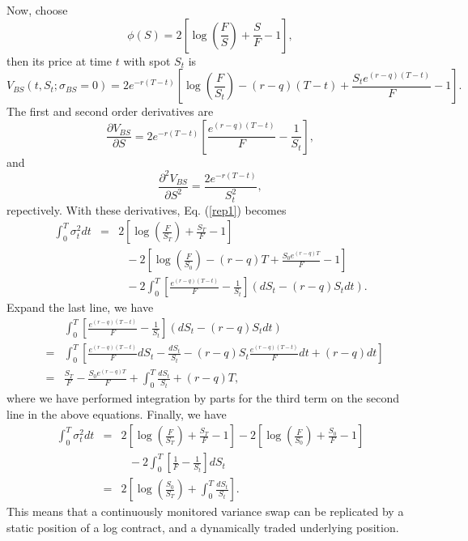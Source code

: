 \documentclass[12pt]{article}
\begin{document}
    Now, choose
    \begin{equation}
      \phi(S) = 2\left[\log\left(\frac{F}{S}\right)+\frac{S}{F}-1\right],
    \end{equation}
    then its price at time $t$ with spot $S_t$ is
    \begin{equation}
      V_{BS}(t,S_t;\sigma_{BS} = 0) = 2e^{-r(T-t)}\left[\log\left(\frac{F}{S_t}\right)-(r-q)(T-t)+\frac{S_te^{(r-q)(T-t)}}{F}-1\right].
    \end{equation}
    The first and second order derivatives are
    \begin{equation}
      \frac{\partial V_{BS}}{\partial S}=2e^{-r(T-t)}\left[\frac{e^{(r-q)(T-t)}}{F}-\frac{1}{S_t}\right],
    \end{equation}
    and
    \begin{equation}
      \frac{\partial^2 V_{BS}}{\partial S^2}=\frac{2e^{-r(T-t)}}{S_t^2},
    \end{equation}
    repectively. With these derivatives, Eq. (\ref{rep1}) becomes
    \begin{eqnarray}
      \int_0^T\sigma_t^2dt &=& 2\left[\log\left(\frac{F}{S_T}\right)+\frac{S_T}{F}-1\right]\nonumber\\
                            && \ \ \ - 2\left[\log\left(\frac{F}{S_0}\right)-(r-q)T+\frac{S_0e^{(r-q)T}}{F}-1\right]\nonumber\\
                            && \ \ \ - 2\int_0^T\left[\frac{e^{(r-q)(T-t)}}{F}-\frac{1}{S_t}\right]\left(dS_t-(r-q)S_tdt\right).
    \end{eqnarray}
    Expand the last line, we have
    \begin{eqnarray}
      &&\int_0^T\left[\frac{e^{(r-q)(T-t)}}{F}-\frac{1}{S_t}\right]\left(dS_t-(r-q)S_tdt\right)\nonumber\\
      &=& \int_0^T\left[\frac{e^{(r-q)(T-t)}}{F}dS_t-\frac{dS_t}{S_t}-(r-q)S_t\frac{e^{(r-q)(T-t)}}{F}dt+(r-q)dt\right]\nonumber\\
      &=& \frac{S_T}{F} - \frac{S_0e^{(r-q)T}}{F} + \int_0^T\frac{dS_t}{S_t} + (r-q)T,
    \end{eqnarray}
    where we have performed integration by parts for the third term on the second line in the above equations.
    Finally, we have
    \begin{eqnarray}
      \int_0^T\sigma_t^2dt &=& 2\left[\log\left(\frac{F}{S_T}\right)+\frac{S_T}{F}-1\right]
                                     - 2\left[\log\left(\frac{F}{S_0}\right)+\frac{S_0}{F}-1\right]\nonumber\\
                            && \ \ \ - 2\int_0^T\left[\frac{1}{F}-\frac{1}{S_t}\right]dS_t\nonumber\\
                           &=& 2\left[\log\left(\frac{S_0}{S_T}\right)+\int_0^T\frac{dS_t}{S_t}\right].
    \end{eqnarray}
    This means that a continuously monitored variance swap can be replicated by a static position of a log contract,
    and a dynamically traded underlying position.
\end{document}
